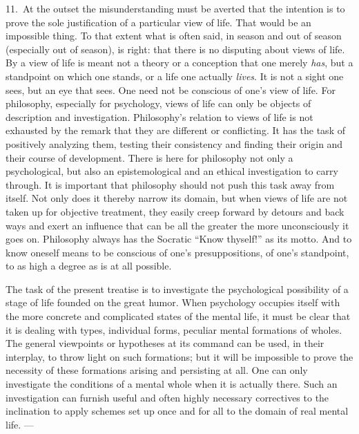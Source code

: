 \documentclass[12pt]{book}
\newcommand{\opage}[1]{\marginnote{\footnotesize\textit{[#1]}}}
\begin{document}
11.~At the outset the misunderstanding must be averted that the intention is to
prove the sole justification of a particular view of life. That would be an
impossible thing. To that extent what is often said, in season and out of season
(especially out of season), is right: that there is no disputing about views of
life. By a view of life is meant not a theory or a conception that one merely
\emph{has}, but a standpoint on which one stands, or a life one actually
\emph{lives}. It is not a sight one sees, but an eye that sees. One need not be
conscious of one's view of life. For philosophy, especially for psychology, views
of life can only be objects of description and investigation. Philosophy's
relation to views of life is not exhausted by the remark that they are different
or conflicting. It has the task of positively analyzing them, testing their
consistency and finding their origin and their course of development. There is
here for philosophy not only a psychological, but also an epistemological and an
ethical investigation to carry through. It is important that philosophy should not
push this task away from itself. Not only does it thereby narrow its domain, but
when views of life are not taken up for objective treatment, they easily creep
forward by detours and back ways and exert an influence that can be all the greater
the more unconsciously it goes on. Philosophy always has the Socratic ``Know
thyself!'' as its motto. And to know oneself \opage{46}means to be conscious of
one's presuppositions, of one's standpoint, to as high a degree as is at all
possible.

The task of the present treatise is to investigate the psychological possibility
of a stage of life founded on the great humor. When psychology occupies itself
with the more concrete and complicated states of the mental life, it must be clear
that it is dealing with types, individual forms, peculiar mental formations of
wholes. The general viewpoints or hypotheses at its command can be used, in their
interplay, to throw light on such formations; but it will be impossible to prove
the necessity of these formations arising and persisting at all. One can only
investigate the conditions of a mental whole when it is actually there. Such an
investigation can furnish useful and often highly necessary correctives to the
inclination to apply schemes set up once and for all to the domain of real mental
life. ---
\end{document}
